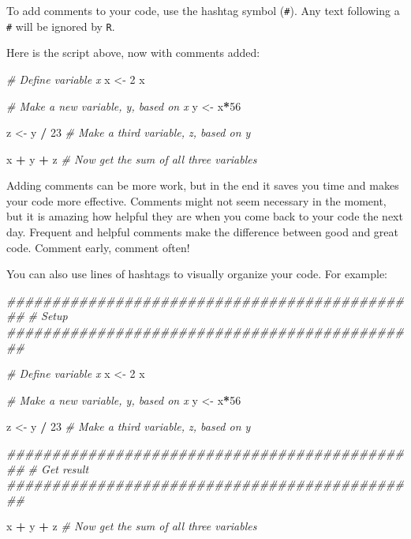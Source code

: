 \documentclass[]{book}
\newenvironment{Shaded}{\begin{snugshade}}{\end{snugshade}}
\newcommand{\CommentTok}[1]{\textcolor[rgb]{0.56,0.35,0.01}{\textit{#1}}}
\newcommand{\DecValTok}[1]{\textcolor[rgb]{0.00,0.00,0.81}{#1}}
\newcommand{\NormalTok}[1]{#1}
\newcommand{\OperatorTok}[1]{\textcolor[rgb]{0.81,0.36,0.00}{\textbf{#1}}}
\newcommand{\StringTok}[1]{\textcolor[rgb]{0.31,0.60,0.02}{#1}}
\begin{document}
To add comments to your code, use the hashtag symbol (\texttt{\#}). Any text following a \texttt{\#} will be ignored by \texttt{R}.

Here is the script above, now with comments added:

\begin{Shaded}
\begin{Highlighting}[]
\CommentTok{# Define variable x}
\NormalTok{x <-}\StringTok{ }\DecValTok{2} 
\NormalTok{x}

\CommentTok{# Make a new variable, y, based on x}
\NormalTok{y <-}\StringTok{ }\NormalTok{x}\OperatorTok{*}\DecValTok{56}

\NormalTok{z <-}\StringTok{ }\NormalTok{y }\OperatorTok{/}\StringTok{ }\DecValTok{23} \CommentTok{# Make a third variable, z, based on y}
 
\NormalTok{x }\OperatorTok{+}\StringTok{ }\NormalTok{y }\OperatorTok{+}\StringTok{ }\NormalTok{z }\CommentTok{# Now get the sum of all three variables}
\end{Highlighting}
\end{Shaded}

Adding comments can be more work, but in the end it saves you time and makes your code more effective. Comments might not seem necessary in the moment, but it is amazing how helpful they are when you come back to your code the next day. Frequent and helpful comments make the difference between good and great code. Comment early, comment often!

You can also use lines of hashtags to visually organize your code. For example:

\begin{Shaded}
\begin{Highlighting}[]
\CommentTok{##############################################}
\CommentTok{# Setup}
\CommentTok{##############################################}

\CommentTok{# Define variable x}
\NormalTok{x <-}\StringTok{ }\DecValTok{2} 
\NormalTok{x}

\CommentTok{# Make a new variable, y, based on x}
\NormalTok{y <-}\StringTok{ }\NormalTok{x}\OperatorTok{*}\DecValTok{56}

\NormalTok{z <-}\StringTok{ }\NormalTok{y }\OperatorTok{/}\StringTok{ }\DecValTok{23} \CommentTok{# Make a third variable, z, based on y}
 

\CommentTok{##############################################}
\CommentTok{# Get result}
\CommentTok{##############################################}

\NormalTok{x }\OperatorTok{+}\StringTok{ }\NormalTok{y }\OperatorTok{+}\StringTok{ }\NormalTok{z }\CommentTok{# Now get the sum of all three variables}
\end{Highlighting}
\end{Shaded}
\end{document}
